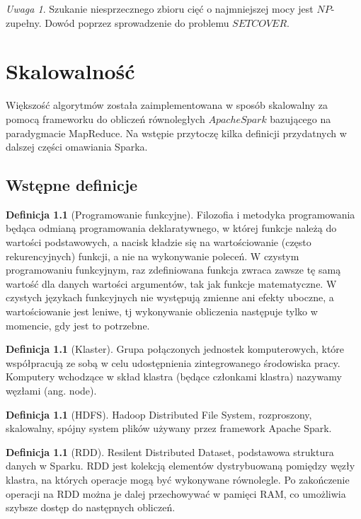 \documentclass[magisterska]{pracamgr}
\theoremstyle{plain}
\theoremstyle{definition}
\newtheorem{definicja}[thm]{Definicja}
\theoremstyle{remark}
\newtheorem{uwaga}[thm]{Uwaga}
\begin{document}
\begin{uwaga}
Szukanie niesprzecznego zbioru cięć o najmniejszej mocy jest $NP$-zupełny.
Dowód poprzez sprowadzenie do problemu $SET COVER$.
\end{uwaga}


\chapter{Skalowalność}

Większość algorytmów została zaimplementowana w sposób skalowalny za pomocą frameworku 
do obliczeń równoległych $Apache Spark$ bazującego na paradygmacie MapReduce.
Na wstępie przytoczę kilka definicji przydatnych w dalszej części omawiania Sparka.

\section{Wstępne definicje}
\begin{definicja}[Programowanie funkcyjne]
Filozofia i metodyka programowania będąca odmianą programowania deklaratywnego, 
w której funkcje należą do wartości podstawowych, a nacisk kładzie się na wartościowanie 
(często rekurencyjnych) funkcji, a nie na wykonywanie poleceń.
W czystym programowaniu funkcyjnym, raz zdefiniowana funkcja zwraca zawsze 
tę samą wartość dla danych wartości argumentów, tak jak funkcje matematyczne.
W czystych językach funkcyjnych nie występują zmienne ani efekty uboczne, 
a wartościowanie jest leniwe, tj wykonywanie obliczenia następuje tylko w momencie, gdy jest to potrzebne.
\end{definicja}

\begin{definicja}[Klaster]
Grupa połączonych jednostek komputerowych, które współpracują ze sobą w celu udostępnienia zintegrowanego środowiska pracy.
Komputery wchodzące w skład klastra (będące członkami klastra) nazywamy węzłami (ang. node).
\end{definicja}

\begin{definicja}[HDFS]
Hadoop Distributed File System, rozproszony, skalowalny, spójny system plików używany przez framework Apache Spark.
\end{definicja}

\begin{definicja}[RDD]
Resilent Distributed Dataset, podstawowa struktura danych w Sparku. RDD jest kolekcją elementów dystrybuowaną pomiędzy 
węzły klastra, na których operacje mogą być wykonywane równolegle. Po zakończenie operacji na RDD można je dalej 
przechowywać w pamięci RAM, co umożliwia szybsze dostęp do następnych obliczeń. 
\end{definicja}
\end{document}
